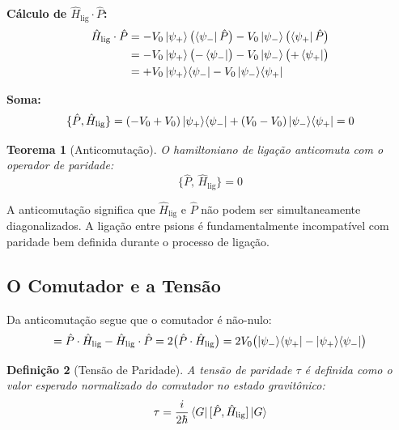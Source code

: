 \documentclass[12pt,a4paper,twoside]{article}
\newtheorem{theorem}{Teorema}[section]
\newtheorem{definition}[theorem]{Defini\c{c}\~ao}
\newcommand{\psion}{\psi}
\begin{document}
\medskip
\noindent\textbf{C\'alculo de $\hat{H}_{\text{lig}}\cdot\hat{P}$:}
\begin{align}
\hat{H}_{\text{lig}}\cdot\hat{P} &= -V_0\ket{\psion_+}\bigl(\bra{\psion_-}\hat{P}\bigr) - V_0\ket{\psion_-}\bigl(\bra{\psion_+}\hat{P}\bigr) \notag \\
&= -V_0\ket{\psion_+}\bigl(-\bra{\psion_-}\bigr) - V_0\ket{\psion_-}\bigl(+\bra{\psion_+}\bigr) \notag \\
&= +V_0\ket{\psion_+}\!\bra{\psion_-} - V_0\ket{\psion_-}\!\bra{\psion_+}
\label{eq:HP}
\end{align}

\medskip
\noindent\textbf{Soma:}
\begin{equation}
\{\hat{P}, \hat{H}_{\text{lig}}\} = (-V_0 + V_0)\ket{\psion_+}\!\bra{\psion_-} + (V_0 - V_0)\ket{\psion_-}\!\bra{\psion_+} = 0
\label{eq:anticomutador_zero}
\end{equation}

\begin{resultbox}[title={Teorema 2 --- Anticomuta\c{c}\~ao}]
\begin{theorem}[Anticomuta\c{c}\~ao]\label{thm:anticomutacao}
O hamiltoniano de liga\c{c}\~ao anticomuta com o operador de paridade:
\begin{equation}
\{\hat{P},\, \hat{H}_{\text{lig}}\} = 0
\end{equation}
\end{theorem}
\end{resultbox}

\noindent A anticomuta\c{c}\~ao significa que $\hat{H}_{\text{lig}}$ e $\hat{P}$ n\~ao podem ser simultaneamente diagonalizados. A liga\c{c}\~ao entre psions \'e fundamentalmente incompat\'ivel com paridade bem definida durante o processo de liga\c{c}\~ao.

\subsection{O Comutador e a Tens\~ao}

Da anticomuta\c{c}\~ao segue que o comutador \'e n\~ao-nulo:
\begin{equation}
[\hat{P}, \hat{H}_{\text{lig}}] = \hat{P}\cdot\hat{H}_{\text{lig}} - \hat{H}_{\text{lig}}\cdot\hat{P} = 2\bigl(\hat{P}\cdot\hat{H}_{\text{lig}}\bigr) = 2V_0\bigl(\ket{\psion_-}\!\bra{\psion_+} - \ket{\psion_+}\!\bra{\psion_-}\bigr)
\label{eq:comutador}
\end{equation}

\begin{definition}[Tens\~ao de Paridade]
A tens\~ao de paridade $\tau$ \'e definida como o valor esperado normalizado do comutador no estado gravit\^onico:
\begin{equation}
\tau = \frac{i}{2\hbar}\bra{G}[\hat{P}, \hat{H}_{\text{lig}}]\ket{G}
\label{eq:tensao_def}
\end{equation}
\end{definition}
\end{document}
